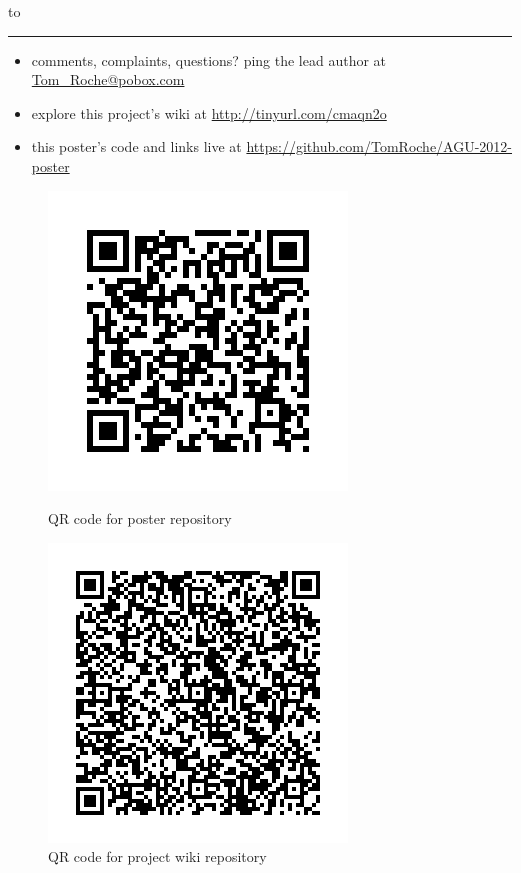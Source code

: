 \documentclass{a0poster} %
\renewcommand{\Large}{\fontsize{43}{45}\selectfont}
\renewcommand{\LARGE}{\fontsize{51.6}{54}\selectfont}
\def\RHead#1{\noindent\hbox to \hsize{\hfil{\LARGE\color{DarkBlue}\textsc{#1}}}\vspace*{-7.6mm}\newline\rule{\textwidth}{5pt}}
\def\Cntct#1{\vspace*{-20mm}\underline{\noindent\hbox to \hsize{\hfil{\Large\color{DarkBlue}#1}}}}
\begin{document}
\begin{textblock}{44}
    \vspace{-10mm}
    \RHead{Contacts}
        \begin{itemize}
            \item comments, complaints, questions? ping the lead author at \url{Tom_Roche@pobox.com}
            \item explore this project's wiki at \url{http://tinyurl.com/cmaqn2o}
            \item this poster's code and links live at \url{https://github.com/TomRoche/AGU-2012-poster}
        \end{itemize}
\begin{figure}[h!]
  \centering
  \begin{minipage}{.4\textwidth}
    \centering
    \includegraphics[scale=0.9]{posterRepoQR} %
    \caption*{QR code for poster repository}
  \end{minipage}
  \begin{minipage}{.4\textwidth}
    \centering
    \includegraphics[scale=0.9]{wikiRepoQR}
    \caption*{QR code for project wiki repository}
  \end{minipage}
\end{figure}


\end{textblock}
\end{document}
